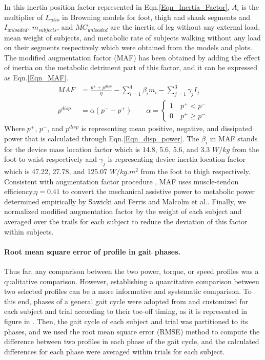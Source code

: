 \documentclass[10pt,letterpaper]{article}
\begin{document}
In this inertia position factor represented in Eqn.\eqref{Eqn_Inertia_Factor}, $A_i$ is the multiplier of $I_{ratio}$ in Browning models for foot, thigh and shank segments and $I_{unloaded}$, $m_{subjects}$, and $MC_{unloaded}$ are the inertia of leg without any external load, mean weight of subjects, and metabolic rate of subjects walking without any load on their segments respectively which were obtained from the \cite{133} models and plots. The modified augmentation factor (MAF) has been obtained by adding the effect of inertia on the metabolic detriment part of this factor, and it can be expressed as Eqn.\eqref{Eqn_MAF}.
\begin{align}
	MAF &= \frac{p^{+}+p^{disp}}{\eta}-\sum_{i=1}^{4}\beta_{i}m_{i}-\sum_{j=1}^{3}\gamma_{j}I_{j}\label{Eqn_MAF}\\
	p^{disp} &= \alpha(p^{-}-p^{+}) \qquad \alpha = \left\{\begin{array}{ll}1\quad p^{+}<p^{-}\\0\quad p^{+}\geq p^{-}\end{array}\right.\label{Eqn_disp_power}
\end{align}
Where $p^{+}$, $p^{-}$, and $p^{disp}$ is representing mean positive, negative, and dissipated power that is calculated through Eqn.\eqref{Eqn_disp_power}. The $\beta_i$ in MAF stands for the device mass location factor which is 14.8, 5.6, 5.6, and 3.3 $W/kg$ from the foot to waist respectively \cite{41,133} and $\gamma_j$ is representing device inertia location factor which is 47.22, 27.78, and 125.07 $W/{kg.m^2}$ from the foot to thigh respectively. Consistent with augmentation factor procedure \cite{41}, MAF uses muscle-tendon efficiency,$\eta = 0.41$ to convert the mechanical assistive power to metabolic power determined empirically by Sawicki and Ferris\cite{149} and Malcolm et al.\cite{40}. Finally, we normalized modified augmentation factor by the weight of each subject and averaged over the trails for each subject to reduce the deviation of this factor within subjects.
\paragraph*{Root mean square error of profile in gait phases.} Thus far, any comparison between the two power, torque, or speed profiles was a qualitative comparison. However, establishing a quantitative comparison between two selected profiles can be a more informative and systematic comparison. To this end, phases of a general gait cycle were adopted from \cite{150} and customized for each subject and trial according to their toe-off timing, as it is represented in figure in . Then, the gait cycle of each subject and trial was partitioned to its phases, and we used the root mean square error (RMSE) method to compute the difference between two profiles in each phase of the gait cycle, and the calculated differences for each phase were averaged within trials for each subject.
\end{document}
